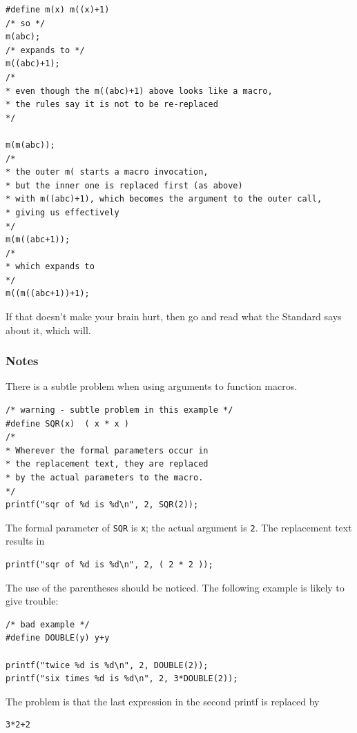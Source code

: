     \begin{Verbatim}
#define m(x) m((x)+1)
/* so */
m(abc);
/* expands to */
m((abc)+1);
/*
* even though the m((abc)+1) above looks like a macro,
* the rules say it is not to be re-replaced
*/

m(m(abc));
/*
* the outer m( starts a macro invocation,
* but the inner one is replaced first (as above)
* with m((abc)+1), which becomes the argument to the outer call,
* giving us effectively
*/
m(m((abc+1));
/*
* which expands to
*/
m((m((abc+1))+1);
\end{Verbatim}

    If that doesn't make your brain hurt, then go and read what the
     Standard says about it, which will.


   

   \subsubsection{Notes}
    

    There is a subtle problem when using arguments to function
     macros.


    \begin{Verbatim}
/* warning - subtle problem in this example */
#define SQR(x)  ( x * x )
/*
* Wherever the formal parameters occur in
* the replacement text, they are replaced
* by the actual parameters to the macro.
*/
printf("sqr of %d is %d\n", 2, SQR(2));
\end{Verbatim}

    The formal parameter of \texttt{SQR} is \texttt{x}; the
     actual argument is \texttt{2}. The replacement text results in


    \begin{Verbatim}
printf("sqr of %d is %d\n", 2, ( 2 * 2 ));
\end{Verbatim}

    The use of the parentheses should be noticed. The following example
     is likely to give trouble:


    \begin{Verbatim}
/* bad example */
#define DOUBLE(y) y+y

printf("twice %d is %d\n", 2, DOUBLE(2));
printf("six times %d is %d\n", 2, 3*DOUBLE(2));
\end{Verbatim}

    The problem is that the last expression in the second printf is
     replaced by


    \begin{Verbatim}
3*2+2
\end{Verbatim}

